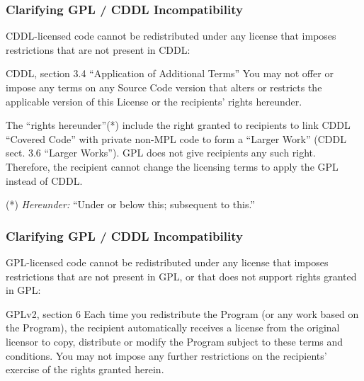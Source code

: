 \begin{frame}
\frametitle{Clarifying GPL / CDDL Incompatibility}

CDDL-licensed code cannot be redistributed under any license that imposes restrictions that are not present in CDDL:

\begin{block}{CDDL, section 3.4 ``Application of Additional Terms''}
\footnotesize
You may not offer or impose any terms on any Source Code version that alters or restricts the applicable version of this License or the recipients' rights hereunder. 
\end{block}

The ``rights hereunder''(*) include the right granted to recipients to link CDDL ``Covered Code'' with private non-MPL code to form a ``Larger Work'' (CDDL sect. 3.6 ``Larger Works''). GPL does not give recipients any such right. Therefore, the recipient cannot change the licensing terms to apply the GPL instead of CDDL. 

\medskip

\footnotesize{(*) \textit{Hereunder:} ``Under or below this; subsequent to this.''}

\end{frame}



\begin{frame}
\frametitle{Clarifying GPL / CDDL Incompatibility}

GPL-licensed code cannot be redistributed under any license that imposes restrictions that are not present in GPL, or that does not support rights granted in GPL: 

\begin{block}{GPLv2, section 6}
\footnotesize
Each time you redistribute the Program (or any work based on the Program), the recipient automatically receives a license from the original licensor to copy, distribute or modify the Program subject to these terms and conditions. You may not impose any further restrictions on the recipients' exercise of the rights granted herein. 
\end{block}

\end{frame}


